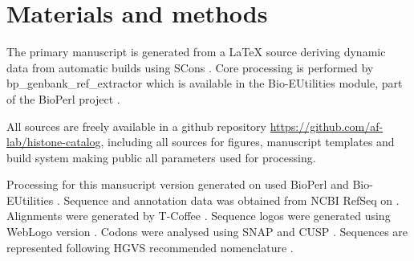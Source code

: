 \section{Materials and methods}
\label{sec:matmethods}

  The primary manuscript is generated from a \LaTeX{} source
  deriving dynamic data from automatic builds using SCons \citep{SCons2005}.
  Core processing is performed by bp\_genbank\_ref\_extractor
  which is available in the Bio-EUtilities module, part of the
  BioPerl project \citep{bioperl}.

  All sources are freely available in a github repository
  \url{https://github.com/af-lab/histone-catalog}, including all
  sources for figures, manuscript templates and build system making public
  all parameters used for processing.

  Processing for this mansucript version generated on 
  used BioPerl \BioPerlVersion{} and Bio-EUtilities \BioEUtilitiesVersion{}.
  Sequence and annotation data was obtained from NCBI RefSeq \citep{PruittRefseq2014} on \SequencesDate{}.
  Alignments were generated by T-Coffee \TCoffeVersion{} \citep{tcoffee2000}.
  Sequence logos were generated using WebLogo version  \citep{weblogo}.
  Codons were analysed using SNAP  \citep{KorberSNAP2000}
  and CUSP  \citep{Emboss2000}.
  Sequences are represented following HGVS recommended nomenclature \citep{mutnomenclature2003}.